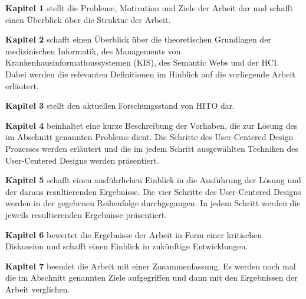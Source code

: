 \textbf{Kapitel 1} stellt die Probleme, Motivation und Ziele der Arbeit dar und schafft einen Überblick über die Struktur der Arbeit. \newline

\textbf{Kapitel 2} schafft einen Überblick über die theoretischen Grundlagen der medizinischen Informatik, des Managements von Krankenhausinformationssystemen (KIS), des Semantic Webs und der \ac{HCI}. Dabei werden die relevanten Definitionen im Hinblick auf die vorliegende Arbeit erläutert.  \newline

\textbf{Kapitel 3} stellt den aktuellen Forschungsstand von HITO dar. \newline

\textbf{Kapitel 4} beinhaltet eine kurze Beschreibung der Vorhaben, die zur Lösung des im Abschnitt  genannten Problems dient. 
Die Schritte des User-Centered Design Prozesses werden erläutert und die im jedem Schritt ausgewählten Techniken des User-Centered Designs werden präsentiert. \newline

\textbf{Kapitel 5} schafft einen ausführlichen Einblick in die Ausführung der Lösung und der daraus resultierenden Ergebnisse. 
Die vier Schritte des User-Centered Designs werden in der gegebenen Reihenfolge durchgegangen.
In jedem Schritt werden die jeweils resultierenden Ergebnisse präsentiert. \newline

\textbf{Kapitel 6} bewertet die Ergebnisse der Arbeit in Form einer kritischen Diskussion und schafft einen Einblick in zukünftige Entwicklungen. \newline

\textbf{Kapitel 7} beendet die Arbeit mit einer Zusammenfassung. Es werden noch mal die im Abschnitt  genannten Ziele aufgegriffen und dann mit den Ergebnissen der Arbeit verglichen.



